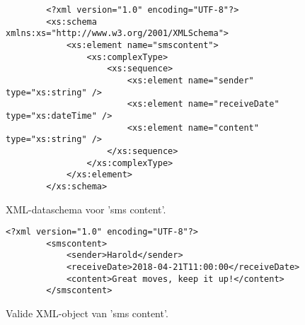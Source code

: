 \begin{appendices}
    \begin{figure}[htb]
        \centering
        \begin{lstlisting}
        <?xml version="1.0" encoding="UTF-8"?>
        <xs:schema xmlns:xs="http://www.w3.org/2001/XMLSchema">
            <xs:element name="smscontent">
                <xs:complexType>
                    <xs:sequence>
                        <xs:element name="sender" type="xs:string" />
                        <xs:element name="receiveDate" type="xs:dateTime" />
                        <xs:element name="content" type="xs:string" />
                    </xs:sequence>
                </xs:complexType>
            </xs:element>
        </xs:schema>                
        \end{lstlisting}
        \caption{XML-dataschema voor 'sms content'.}
        \label{fig:xmlschemasmscontent}
    \end{figure}

    \begin{figure}[htb]
        \centering
        \lstset{language=XML}
        \begin{lstlisting}[firstnumber=1]
        <?xml version="1.0" encoding="UTF-8"?>
        <smscontent>
            <sender>Harold</sender>
            <receiveDate>2018-04-21T11:00:00</receiveDate>
            <content>Great moves, keep it up!</content>
        </smscontent>              
        \end{lstlisting}
        \caption{Valide XML-object van 'sms content'.}
        \label{fig:xmlsmscontent}
    \end{figure}


\end{appendices}
